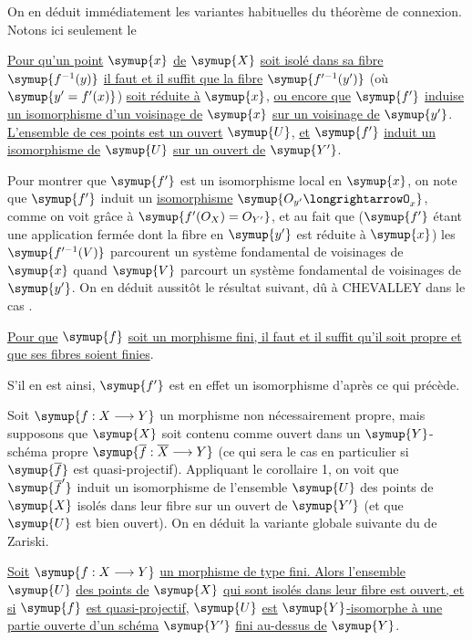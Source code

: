 On en déduit immédiatement les variantes habituelles du théorème de connexion.
Notons ici seulement le

 \uline{Pour qu'un point} $\symup{x}$ \uline{de} $\symup{X}$ \uline{soit isolé dans sa fibre}
$\symup{f^{-1}(y)}$ \uline{il faut et il suffit que la fibre} $\symup{f'^{-1}(y')}$ (où
$\symup{y'=f'(x)}$) \uline{soit réduite à} $\symup{x}$, \uline{ou encore que} $\symup{f'}$ \uline{induise un isomorphisme
d'un voisinage de} $\symup{x}$ \uline{sur un voisinage de} $\symup{y'}$. \uline{L'ensemble de ces points est
un ouvert} $\symup{U}$, \uline{et} $\symup{f'}$ \uline{induit un isomorphisme de} $\symup{U}$ \uline{sur un ouvert de} $\symup{Y'}$.

Pour montrer que $\symup{f'}$ est un isomorphisme local en $\symup{x}$, on note que $\symup{f'}$ induit
un \uline{isomorphisme} $\symup{O_{y'}\longrightarrowO_x}$, comme on voit grâce à
$\symup{f'(O_X)=O_{Y'}}$, et au fait que ($\symup{f'}$ étant une application fermée
dont la fibre en $\symup{y'}$ est réduite à $\symup{x}$) les $\symup{f'^{-1}(V)}$ parcourent un
système fondamental de voisinages de $\symup{x}$ quand $\symup{V}$ parcourt un système
fondamental de voisinages de $\symup{y'}$. On en déduit aussitôt le résultat suivant,
dû à CHEVALLEY dans le cas .

 \uline{Pour que} $\symup{f}$ \uline{soit un morphisme fini, il faut et il
suffit qu'il soit propre et que ses fibres soient finies}.

S'il en est ainsi, $\symup{f'}$ est en effet un isomorphisme d'après ce qui précède.

Soit $\symup{f:X\longrightarrow Y}$ un morphisme non nécessairement propre, mais
supposons que $\symup{X}$ soit contenu comme ouvert dans un $\symup{Y}$-schéma propre
$\symup{\overline f:\overline X\longrightarrow Y}$ (ce qui sera le cas en
particulier si $\symup{\overline f}$ est quasi-projectif). Appliquant le corollaire 1, on voit que
$\symup{\overline f'}$ induit un isomorphisme de l'ensemble $\symup{U}$ des points de $\symup{X}$
isolés dans leur fibre sur un ouvert de $\symup{Y'}$ (et que $\symup{U}$ est bien ouvert). On
en déduit la variante globale suivante du  de Zariski.

 \uline{Soit}
$\symup{f:X\longrightarrow Y}$ \uline{un morphisme de type fini. Alors l'ensemble} $\symup{U}$ \uline{des
points de} $\symup{X}$ \uline{qui sont isolés dans leur fibre est ouvert, et si} $\symup{f}$ \uline{est
quasi-projectif}, $\symup{U}$ \uline{est}
$\symup{Y}$\uline{-isomorphe à une partie ouverte d'un schéma} $\symup{Y'}$ \uline{fini au-dessus de} $\symup{Y}$.

